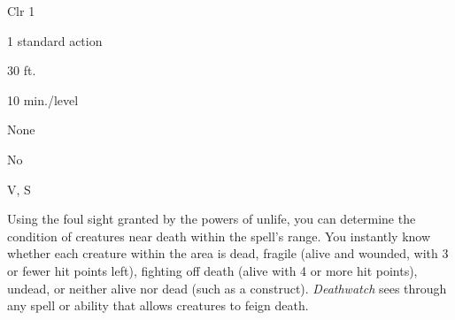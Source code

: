 
\begin{description*}
\item[Level:] Clr 1
\item[Casting Time:] 1 standard action
\item[Range:] 30 ft.
\item[Duration:] 10 min./level
\item[Saving Throw:] None
\item[Spell Resistance:] No
\item[Components:] V, S
\end{description*}

Using the foul sight granted by the powers of unlife, you can determine the condition
of creatures near death within the spell's range. You instantly know whether each
creature within the area is dead, fragile (alive and wounded, with 3 or fewer hit
points left), fighting off death (alive with 4 or more hit points), undead, or
neither alive nor dead (such as a construct).
\textit{Deathwatch} sees through any spell or ability that allows creatures to
feign death.